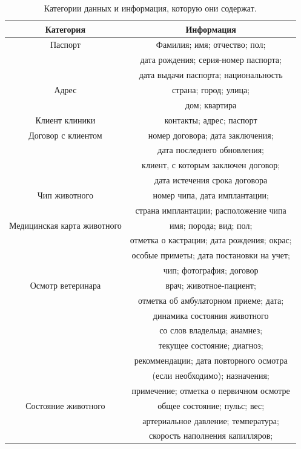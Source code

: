 \documentclass[a4paper,14pt]{article}
\begin{document}
\begin{table}[!h]
	\caption{Категории данных и информация, которую они содержат.}
	\begin{center}
		\begin{tabular}{| c | c |}
	 	\hline
		Категория & Информация \\ \hline
	Паспорт &  Фамилия; имя; отчество; пол; \\
		& дата рождения; серия-номер паспорта; \\ & дата выдачи паспорта; национальность \\ \hline
	Адрес & страна; город; улица; \\
		& дом; квартира \\ \hline
    Клиент клиники & контакты; адрес; паспорт \\ \hline
	Договор с клиентом & номер договора; дата заключения; \\
		& дата последнего обновления; \\
		& клиент, с которым заключен договор; \\
		& дата истечения срока договора  \\ \hline
	Чип животного & номер чипа, дата имплантации; \\
		& страна имплантации; расположение чипа \\ \hline
	Медицинская карта животного & имя; порода; вид; пол; \\
		& отметка о кастрации; дата рождения; окрас; \\
		& особые приметы; дата постановки на учет; \\
		& чип; фотография; договор \\ \hline
	Осмотр ветеринара & врач; животное-пациент; \\
		& отметка об амбулаторном приеме; дата; \\
		& динамика состояния животного \\ 
		& со слов владельца; анамнез; \\ 
		& текущее состояние; диагноз; \\ 
		& рекоммендации; дата повторного осмотра \\ 
		& (если необходимо); назначения; \\
		& примечение; отметка о первичном осмотре \\ \hline
	Состояние животного & общее состояние; пульс; вес; \\
		& артериальное давление; температура; \\
		& скорость наполнения капилляров; \\

\end{tabular}
\end{center}
\end{table}
\end{document}
